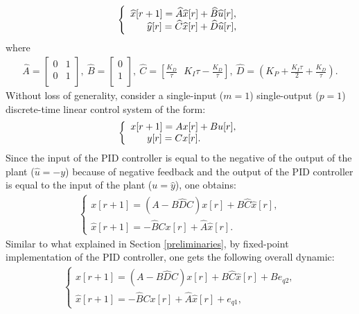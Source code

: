 \documentclass{amsart}
\numberwithin{equation}{section}
\begin{document}
\begin{eqnarray}\label{state_PID}
\left\{\begin{array}{l}\widehat{x}[r+1]=\widehat{A}\widehat{x}[r]+\widehat{B}\widehat{u}[r],\\
\hspace{6mm}\widehat{y}[r]=\widehat{C}\widehat{x}[r]+\widehat{D}\widehat{u}[r],\end{array}\right.
\end{eqnarray}
where
\begin{eqnarray}\nonumber
\widehat{A}=\left[ {\begin{array}{cc}
0&1 \\
0&1\\
 \end{array}}\right],~\widehat{B}=\left[ {\begin{array}{c}
0\\
1\\
 \end{array}}\right],~\widehat{C}=\left[\frac{K_D}{\tau}~~~K_I\tau-\frac{K_D}{\tau}\right],~\widehat{D}=\left(K_P+\frac{K_I\tau}{2}+\frac{K_D}{\tau}\right).
\end{eqnarray}
Without loss of generality, consider a single-input ($m=1$) single-output ($p=1$) discrete-time linear control system of the form:
\begin{eqnarray}\nonumber
\left\{\begin{array}{l}x[r+1]=Ax[r]+Bu[r],\\
\hspace{6mm}y[r]=Cx[r].\end{array}\right.
\end{eqnarray}
Since the input of the PID controller is equal to the negative of the output of the plant ($\widehat{u}=-y$) because of negative feedback and the output of the PID controller is equal to the input of the plant ($u=\widehat{y}$), one obtains:
\begin{eqnarray}
\left\{\begin{array}{l}x[r+1]=\left(A-B\widehat{D}C\right)x[r]+B\widehat{C}\widehat{x}[r],\\
\widehat{x}[r+1]=-\widehat{B}Cx[r]+\widehat{A}\widehat{x}[r].\end{array}\right.
\end{eqnarray}
Similar to what explained in Section \ref{preliminaries}, by fixed-point implementation of the PID controller, one gets the following overall dynamic:
\begin{eqnarray}\label{overall5}
\left\{\begin{array}{l}x[r+1]=\left(A-B\widehat{D}C\right)x[r]+B\widehat{C}\widehat{x}[r]+Be_{q2},\\
\widehat{x}[r+1]=-\widehat{B}Cx[r]+\widehat{A}\widehat{x}[r]+e_{q1},\end{array}\right.
\end{eqnarray}
\end{document}
